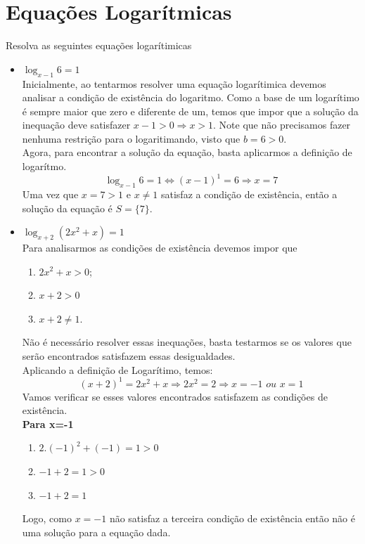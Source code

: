 \section{Equações Logarítmicas
}
\begin{exe}
Resolva as seguintes equações logarítimicas
\begin{itemize}
    \item[a)] $\log_{x-1}6=1$ \\
    \color{red}
    Inicialmente, ao tentarmos resolver uma equação logarítimica devemos analisar a condição de existência do logaritmo. Como a base de um logarítimo é sempre maior que zero e diferente de um, temos que impor que a solução da inequação deve satisfazer $x-1>0 \Longrightarrow x>1$. Note que não precisamos fazer nenhuma restrição para o logaritimando, visto que $b=6>0$. \\
    Agora, para encontrar a solução da equação, basta aplicarmos a definição de logarítmo.
    $$\log_{x-1}6=1 \Leftrightarrow  (x-1)^1=6 \Longrightarrow x=7  $$
    Uma vez que $x=7>1$ e $x\neq1$ satisfaz a condição de existência, então a solução da equação é $S=\{ 7\}$.
    \color{black}
    \item[b)] $\log_{x+2}(2x^2+x)=1$
    \\
    \color{red} Para analisarmos as condições de existência devemos impor que
    \begin{enumerate}
    \item[1.] $2x^2+x>0$;
    \item[2.]$x+2>0$
    \item[3.]$x+2 \neq 1$.
    \end{enumerate}
    Não é necessário resolver essas inequações, basta testarmos se os valores que serão encontrados satisfazem essas desigualdades. \\
    Aplicando a definição de Logarítimo, temos:
    $$(x+2)^1 =2x^2+x \Longrightarrow 2x^2=2 \Longrightarrow x=-1 \,\, ou \,\, x=1$$
    Vamos verificar se esses valores encontrados satisfazem as condições de existência. \\
     \textbf{Para x=-1}
    \begin{enumerate}
    \item[1.] $2.(-1)^2+(-1)=1 >0$
    \item[2.] $-1+2=1>0$
    \item[3.] $-1+2=1$
    \end{enumerate}
    Logo, como $x=-1$ não satisfaz a terceira condição de existência então não é uma solução para a equação dada. \\

\end{itemize}
\end{exe}
